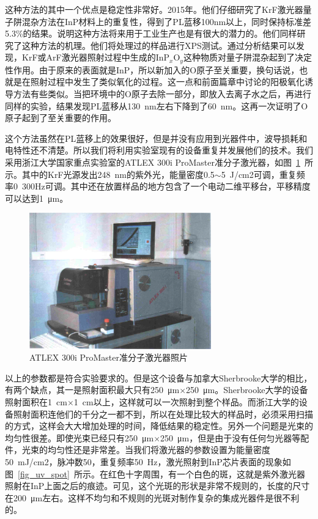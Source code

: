 \documentclass{ZJUthesis}
\begin{document}
这种方法的其中一个优点是稳定性非常好。2015年。他们仔细研究了KrF激光器量子阱混杂方法在InP材料上的重复性，得到了PL蓝移100nm以上，同时保持标准差5.3\%的结果\cite{Beal2015Excimer}。说明这种方法将来用于工业生产也是有很大的潜力的。他们同样研究了这种方法的机理。他们将处理过的样品进行XPS测试\cite{Liu2013Chemical}。通过分析结果可以发现，KrF或ArF激光器照射过程中生成的InP$_x$O$_y$这种物质对量子阱混杂起到了决定性作用。由于原来的表面就是InP，所以新加入的O原子至关重要，换句话说，也就是在照射过程中发生了类似氧化的过程。这一点和前面篇章中讨论的阳极氧化诱导方法有些类似。当把环境中的O原子去除一部分，即放入去离子水之后，再进行同样的实验，结果发现PL蓝移从130~nm左右下降到了60~nm。这再一次证明了O原子起到了至关重要的作用。

这个方法虽然在PL蓝移上的效果很好，但是并没有应用到光器件中，波导损耗和电特性还不清楚。所以我们将利用实验室现有的设备重复并发展他们的技术。我们采用浙江大学国家重点实验室的ATLEX 300i ProMaster准分子激光器，如图~\ref{fig_promaster}~所示。其中的KrF光源发出248~nm的紫外光，能量密度0.5$\sim$5~J/cm2可调，重复频率0~300Hz可调。其中还在放置样品的地方包含了一个电动二维平移台，平移精度可以达到1~μm。

\begin{figure}[htbp]
    \centering
    \includegraphics[width=0.7\textwidth]{./Pictures/promaster.eps}
    \caption{ATLEX 300i ProMaster准分子激光器照片}
    \label{fig_promaster}
\end{figure}

以上的参数都是符合实验要求的。但是这个设备与加拿大Sherbrooke大学的相比，有两个缺点，其一是照射面积最大只有250~μm$\times$250~μm。Sherbrooke大学的设备照射面积在1~cm$\times$1~cm以上，这样就可以一次照射到整个样品。而浙江大学的设备照射面积连他们的千分之一都不到，所以在处理比较大的样品时，必须采用扫描的方式，这样会大大增加处理的时间，降低结果的稳定性。另外一个问题是光束的均匀性很差。即使光束已经只有250~μm$\times$250~μm，但是由于没有任何匀光器等配件，光束的均匀性还是非常差。当我们将激光器的参数设置为能量密度50~mJ/cm2，脉冲数50，重复频率50~Hz，激光照射到InP芯片表面的现象如图~\ref{fig_uv_spot}~所示。在红色十字周围，有一个白色的斑，这就是紫外激光器照射在InP上面之后的痕迹。可见，这个光斑的形状是非常不规则的，长度的尺寸在200~μm左右。这样不均匀和不规则的光斑对制作复杂的集成光器件是很不利的。
\end{document}
